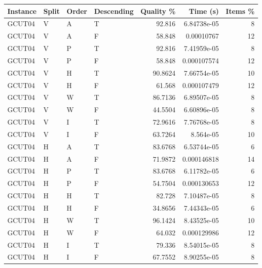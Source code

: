 \begin{tabular}{llllrrr}
    \hline
    Instance & Split & Order & Descending & Quality \% & Time (s)    & Items \% \\
    \hline
    GCUT04   & V     & A     & T          & 92.816     & 6.84738e-05 & 8        \\
    GCUT04   & V     & A     & F          & 58.848     & 0.00010767  & 12       \\
    GCUT04   & V     & P     & T          & 92.816     & 7.41959e-05 & 8        \\
    GCUT04   & V     & P     & F          & 58.848     & 0.000107574 & 12       \\
    GCUT04   & V     & H     & T          & 90.8624    & 7.66754e-05 & 10       \\
    GCUT04   & V     & H     & F          & 61.568     & 0.000107479 & 12       \\
    GCUT04   & V     & W     & T          & 86.7136    & 6.89507e-05 & 8        \\
    GCUT04   & V     & W     & F          & 44.5504    & 6.60896e-05 & 8        \\
    GCUT04   & V     & I     & T          & 72.9616    & 7.76768e-05 & 8        \\
    GCUT04   & V     & I     & F          & 63.7264    & 8.564e-05   & 10       \\
    GCUT04   & H     & A     & T          & 83.6768    & 6.53744e-05 & 6        \\
    GCUT04   & H     & A     & F          & 71.9872    & 0.000146818 & 14       \\
    GCUT04   & H     & P     & T          & 83.6768    & 6.11782e-05 & 6        \\
    GCUT04   & H     & P     & F          & 54.7504    & 0.000130653 & 12       \\
    GCUT04   & H     & H     & T          & 82.728     & 7.10487e-05 & 8        \\
    GCUT04   & H     & H     & F          & 34.8656    & 7.44343e-05 & 6        \\
    GCUT04   & H     & W     & T          & 96.1424    & 8.43525e-05 & 10       \\
    GCUT04   & H     & W     & F          & 64.032     & 0.000129986 & 12       \\
    GCUT04   & H     & I     & T          & 79.336     & 8.54015e-05 & 8        \\
    GCUT04   & H     & I     & F          & 67.7552    & 8.90255e-05 & 8        \\

\end{tabular}
